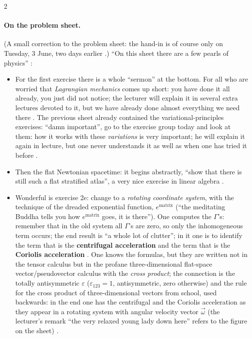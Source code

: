 \begin{paracol}{2}
\paragraph{On the problem sheet.} (A small correction to the problem sheet: the hand-in is of course only on Tuesday, 3 June, two days earlier .) ``On this sheet there are a few pearls of physics'' :
\begin{itemize}
  \item For the first exercise there is a whole ``sermon'' at the bottom. For all who are worried that \emph{Lagrangian mechanics} comes up short: you have done it all already, you just did not notice; the lecturer will explain it in several extra lectures devoted to it, but we have already done almost everything we need there .
        The previous sheet already contained the variational-principles exercises: ``damn important'', go to the exercise group today and look at them: how it works with these \emph{variations} is very important; he will explain it again in lecture, but one never understands it as well as when one has tried it before .
  \item Then the flat Newtonian spacetime: it begins abstractly, ``show that there is still such a flat stratified atlas'', a very nice exercise in linear algebra .
  \item Wonderful is exercise 2e: change to a \emph{rotating coordinate system}, with the technique of the dreaded exponential function, $e^{\text{matrix}}$ (``the meditating Buddha tells you how $e^{\text{matrix}}$ goes, it is there''). One computes the $\Gamma$'s: remember that in the old system all $\Gamma$'s are zero,
        so only the inhomogeneous term occurs; the end result is ``a whole lot of clutter''; in it one is to identify the term that is the \textbf{centrifugal acceleration} and the term that is the \textbf{Coriolis acceleration} . One knows the formulas, but they are written not in the tensor calculus but in the
        profane three-dimensional flat-space vector/pseudovector calculus with the \emph{cross product}; the connection is the totally antisymmetric $\varepsilon$ ($\varepsilon_{123}=1$, antisymmetric, zero otherwise) and the rule for the cross product of three-dimensional vectors from school, used backwards: in the end one has the centrifugal and the Coriolis acceleration as they appear in a rotating system with angular velocity vector $\vec\omega$
        (the lecturer's remark ``the very relaxed young lady down here'' refers to the figure on the sheet) .

\end{itemize}
\end{paracol}
